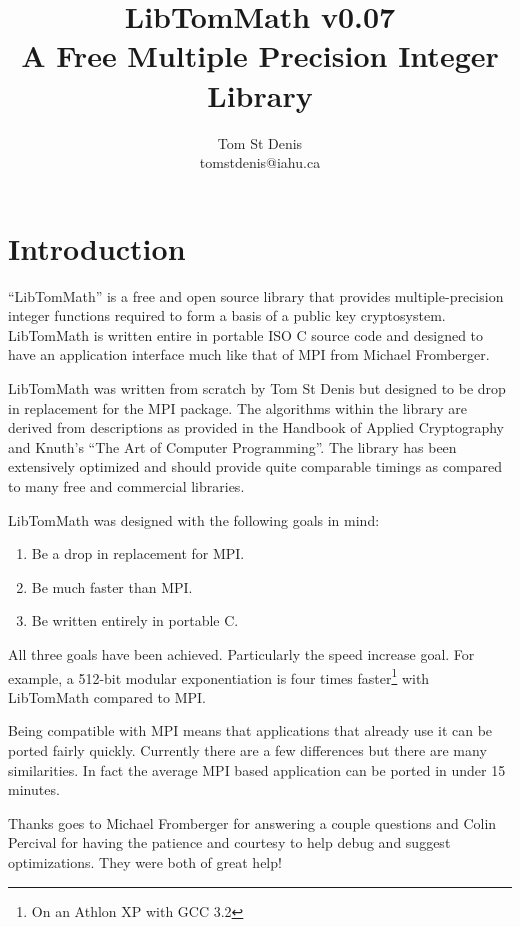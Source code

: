 \documentclass{article}
\begin{document}
\title{LibTomMath v0.07 \\ A Free Multiple Precision Integer Library}
\author{Tom St Denis \\ tomstdenis@iahu.ca}
\maketitle
\newpage

\section{Introduction}
``LibTomMath'' is a free and open source library that provides multiple-precision integer functions required to form a basis
of a public key cryptosystem.  LibTomMath is written entire in portable ISO C source code and designed to have an application
interface much like that of MPI from Michael Fromberger.  

LibTomMath was written from scratch by Tom St Denis but designed to be  drop in replacement for the MPI package.  The 
algorithms within the library are derived from descriptions as provided in the Handbook of Applied Cryptography and Knuth's
``The Art of Computer Programming''.  The library has been extensively optimized and should provide quite comparable 
timings as compared to many free and commercial libraries.

LibTomMath was designed with the following goals in mind:
\begin{enumerate}
\item Be a drop in replacement for MPI.
\item Be much faster than MPI.
\item Be written entirely in portable C.
\end{enumerate}

All three goals have been achieved.  Particularly the speed increase goal.  For example, a 512-bit modular exponentiation is
four times faster\footnote{On an Athlon XP with GCC 3.2} with LibTomMath compared to MPI.

Being compatible with MPI means that applications that already use it can be ported fairly quickly.  Currently there are 
a few differences but there are many similarities.  In fact the average MPI based application can be ported in under 15
minutes.  

Thanks goes to Michael Fromberger for answering a couple questions and Colin Percival for having the patience and courtesy to
help debug and suggest optimizations.  They were both of great help!
\end{document}
